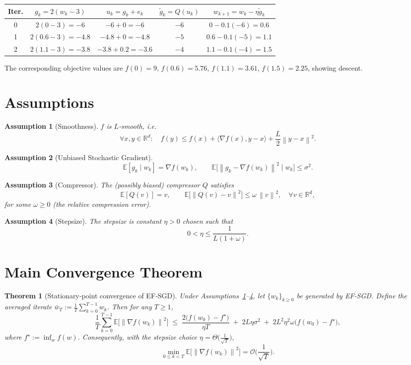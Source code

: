 \documentclass{article}
\newtheorem{theorem}{Theorem}
\newtheorem{assumption}{Assumption}
\newcommand{\EE}{\mathbb{E}}
\newcommand{\RR}{\mathbb{R}}
\newcommand{\norm}[1]{\left\lVert#1\right\rVert}
\newcommand{\inner}[2]{\langle #1,#2\rangle}
\begin{document}
\begin{center}
\begin{tabular}{c|c|c|c|c}
\textbf{Iter.}& $g_{k}=2(w_{k}-3)$ & $u_{k}=g_{k}+e_{k}$ & $\tilde g_{k}=Q(u_{k})$ & $w_{k+1}=w_{k}-\eta\tilde g_{k}$\\\hline
0 & $2(0-3)=-6$ & $-6+0=-6$ & $-6$ & $0-0.1(-6)=0.6$\\
1 & $2(0.6-3)=-4.8$ & $-4.8+0= -4.8$ & $-5$ & $0.6-0.1(-5)=1.1$\\
2 & $2(1.1-3)=-3.8$ & $-3.8+0.2= -3.6$ & $-4$ & $1.1-0.1(-4)=1.5$\\
\end{tabular}
\end{center}
The corresponding objective values are $f(0)=9$, $f(0.6)=5.76$, $f(1.1)=3.61$, $f(1.5)=2.25$, showing descent.

\section*{Assumptions}
\begin{assumption}[Smoothness]\label{ass:smooth}
$f$ is $L$‑smooth, i.e.
\[
\forall x,y\in\RR^{d}:\quad f(y)\le f(x)+\inner{\nabla f(x)}{y-x}+\frac{L}{2}\norm{y-x}^{2}.
\]
\end{assumption}
\begin{assumption}[Unbiased Stochastic Gradient]\label{ass:unbiased}
\[
\EE[g_{k}\mid w_{k}]=\nabla f(w_{k}),\qquad
\EE\big[\norm{g_{k}-\nabla f(w_{k})}^{2}\mid w_{k}\big]\le\sigma^{2}.
\]
\end{assumption}
\begin{assumption}[Compressor]\label{ass:compressor}
The (possibly biased) compressor $Q$ satisfies
\[
\EE[Q(v)]=v,\qquad 
\EE\big[\norm{Q(v)-v}^{2}\big]\le \omega\,\norm{v}^{2},\quad\forall v\in\RR^{d},
\]
for some $\omega\ge0$ (the \emph{relative compression error}).
\end{assumption}
\begin{assumption}[Stepsize]\label{ass:stepsize}
The stepsize is constant $\eta>0$ chosen such that
\[
0<\eta\le\frac{1}{L(1+\omega)}.
\]
\end{assumption}

\section*{Main Convergence Theorem}
\begin{theorem}[Stationary‑point convergence of EF‑SGD]\label{thm:efsgd}
Under Assumptions~\ref{ass:smooth}–\ref{ass:stepsize}, let $\{w_{k}\}_{k\ge0}$ be generated by EF‑SGD.  
Define the averaged iterate $\bar w_{T}:=\frac{1}{T}\sum_{k=0}^{T-1}w_{k}$.  
Then for any $T\ge1$,
\[
\frac{1}{T}\sum_{k=0}^{T-1}\EE\big[\norm{\nabla f(w_{k})}^{2}\big]\;\le\;
\frac{2\big(f(w_{0})-f^{\star}\big)}{\eta T}
\;+\;2L\eta\sigma^{2}
\;+\;2L^{2}\eta^{2}\omega\big(f(w_{0})-f^{\star}\big),
\]
where $f^{\star}:=\inf_{w}f(w)$.  
Consequently, with the stepsize choice $\eta =\Theta\!\big(\tfrac{1}{\sqrt{T}}\big)$,
\[
\min_{0\le k<T}\EE\!\big[\norm{\nabla f(w_{k})}^{2}\big]=\mathcal{O}\!\Big(\frac{1}{\sqrt{T}}\Big).
\]
\end{theorem}
\end{document}
